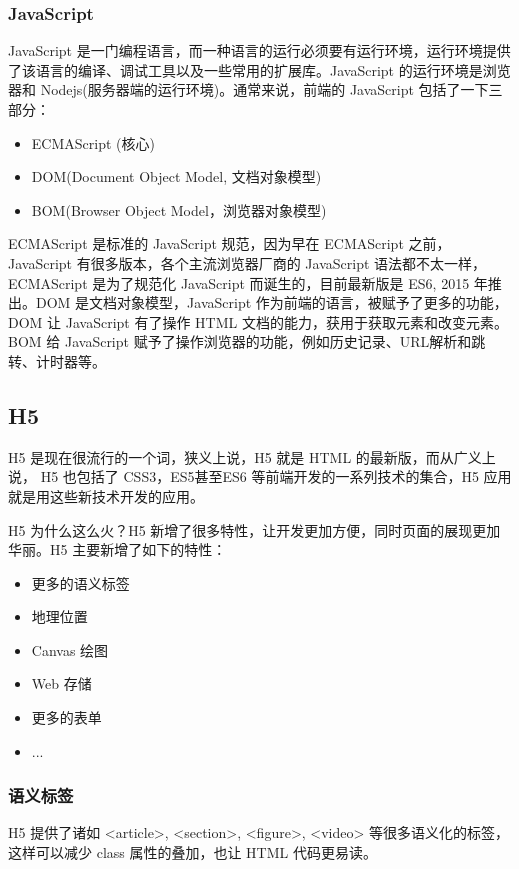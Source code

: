             \subsubsection{JavaScript}
              \label{subsubsec:javascript}
                JavaScript 是一门编程语言，而一种语言的运行必须要有运行环境，运行环境提供了该语言的编译、调试工具以及一些常用的扩展库。JavaScript 的运行环境是浏览器和 Nodejs(服务器端的运行环境)。通常来说，前端的 JavaScript 包括了一下三部分：
                \begin{itemize}
                  \item ECMAScript (核心)
                  \item DOM(Document Object Model, 文档对象模型)
                  \item BOM(Browser Object Model，浏览器对象模型)
                \end{itemize}
                \par
                ECMAScript 是标准的 JavaScript 规范，因为早在 ECMAScript 之前，JavaScript 有很多版本，各个主流浏览器厂商的 JavaScript 语法都不太一样，ECMAScript 是为了规范化 JavaScript 而诞生的，目前最新版是 ES6, 2015 年推出。DOM 是文档对象模型，JavaScript 作为前端的语言，被赋予了更多的功能，DOM 让 JavaScript 有了操作 HTML 文档的能力，获用于获取元素和改变元素。BOM 给 JavaScript 赋予了操作浏览器的功能，例如历史记录、URL解析和跳转、计时器等。

        \subsection{H5}
          \label{subsec:h5}
            H5 是现在很流行的一个词，狭义上说，H5 就是 HTML 的最新版，而从广义上说， H5 也包括了 CSS3，ES5甚至ES6 等前端开发的一系列技术的集合，H5 应用就是用这些新技术开发的应用。
            \par
            H5 为什么这么火？H5 新增了很多特性，让开发更加方便，同时页面的展现更加华丽。H5 主要新增了如下的特性：
            \begin{itemize}
              \item 更多的语义标签
              \item 地理位置
              \item Canvas 绘图
              \item Web 存储
              \item 更多的表单
              \item ...
            \end{itemize}
            \subsubsection{语义标签}
              \label{subsubsec:语义标签}
                H5 提供了诸如 <article>, <section>, <figure>, <video> 等很多语义化的标签，这样可以减少 class 属性的叠加，也让 HTML 代码更易读。

